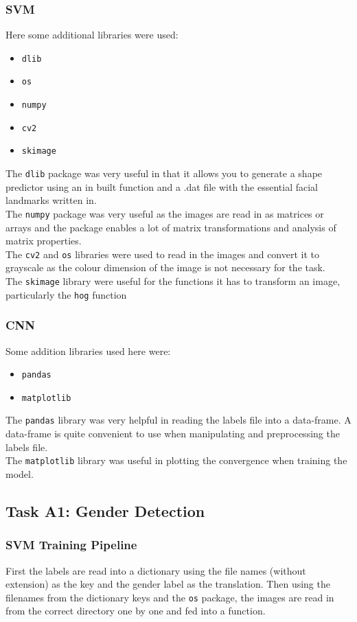\documentclass{article}
\begin{document}
    \subsubsection{SVM}
	Here some additional libraries were used:
	\begin{itemize}
		\item \verb|dlib|
		\item \verb|os|
		\item \verb|numpy|
		\item \verb|cv2|
		\item \verb|skimage|
	\end{itemize}
	The \verb|dlib| package was very useful in that it allows you to generate a shape predictor using an in built function and a .dat file with the essential facial landmarks written in.\\
	The \verb|numpy| package was very useful as the images are read in as matrices or arrays and the package enables a lot of matrix transformations and analysis of matrix properties.\\
	The \verb|cv2| and \verb|os| libraries were used to read in the images and convert it to grayscale as the colour dimension of the image is not necessary for the task.\\
	The \verb|skimage| library were useful for the functions it has to transform an image, particularly the \verb|hog| function
    \subsubsection{CNN}
    Some addition libraries used here were:
    \begin{itemize}
    	\item \verb|pandas|
    	\item \verb|matplotlib|
    \end{itemize}
    The \verb|pandas| library was very helpful in reading the labels file into a data-frame. A data-frame is quite convenient to use when manipulating and preprocessing the labels file.\\
    The \verb|matplotlib| library was useful in plotting the convergence when training the model. 
    \subsection{Task A1: Gender Detection}
	\subsubsection{SVM Training Pipeline}
	 First the labels are read into a dictionary using the file names (without extension) as the key and the gender label as the translation. Then using the filenames from the dictionary keys and the \verb|os| package, the images are read in from the correct directory one by one and fed into a function.\\
	 
\end{document}
